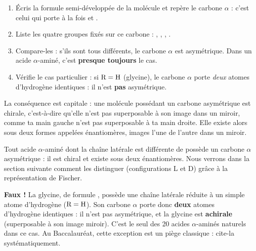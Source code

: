 \documentclass[11pt]{article}
\newcommand{\cle}[1]{{\popxbold\color{popdark}#1}}
\begin{document}
\begin{methode}
\begin{enumerate}
\item Écris la formule semi-développée de la molécule et repère le carbone $\alpha$ : c'est celui qui porte à la fois  et .
\item Liste les quatre groupes fixés sur ce carbone : , , , .
\item Compare-les : s'ils sont tous différents, le carbone $\alpha$ est asymétrique. Dans un acide $\alpha$-aminé, c'est \textbf{presque toujours} le cas.
\item Vérifie le cas particulier : si $\ce{R} = \ce{H}$ (glycine), le carbone $\alpha$ porte \emph{deux} atomes d'hydrogène identiques : il n'est \textbf{pas} asymétrique.
\end{enumerate}
\end{methode}

La conséquence est capitale : une molécule possédant un carbone asymétrique est \cle{chirale}, c'est-à-dire qu'elle n'est pas superposable à son image dans un miroir, comme ta main gauche n'est pas superposable à ta main droite. Elle existe alors sous deux formes appelées \cle{énantiomères}, images l'une de l'autre dans un miroir.

\begin{aretenir}
Tout acide $\alpha$-aminé dont la chaîne latérale  est différente de  possède un carbone $\alpha$ asymétrique : il est \cle{chiral} et existe sous deux énantiomères. Nous verrons dans la section suivante comment les distinguer (configurations L et D) grâce à la représentation de Fischer.
\end{aretenir}

\begin{attention}
\textbf{Faux !} La \cle{glycine}, de formule , possède une chaîne latérale réduite à un simple atome d'hydrogène ($\ce{R} = \ce{H}$). Son carbone $\alpha$ porte donc \textbf{deux} atomes d'hydrogène identiques : il n'est pas asymétrique, et la glycine est \textbf{achirale} (superposable à son image miroir). C'est le seul des 20 acides $\alpha$-aminés naturels dans ce cas. Au Baccalauréat, cette exception est un piège classique : cite-la systématiquement.
\end{attention}
\end{document}
